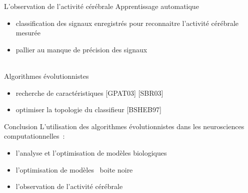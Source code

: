 \documentclass{beamer}
\begin{document}
\begin{frame}{L'observation de l'activité cérébrale}
    Apprentissage automatique
    \begin{itemize}
        \item classification des signaux enregistrés pour reconnaitre
              l'activité cérébrale mesurée
        \item pallier au manque de précision des signaux
    \end{itemize}
    ~\\
    Algorithmes évolutionnistes
    \begin{itemize}
        \item recherche de caractéristiques [GPAT03] [SBR03]
        \item optimiser la topologie du classifieur [BSHEB97]
    \end{itemize}
\end{frame}

\begin{frame}{Conclusion}
    L'utilisation des algorithmes évolutionnistes dans les neurosciences
    computationnelles~:
    \begin{itemize}
        \item l'analyse et l'optimisation de modèles biologiques
        \item l'optimisation de modèles \og~boite noire~\fg
        \item l'observation de l'activité cérébrale
    \end{itemize}
\end{frame}
\end{document}
